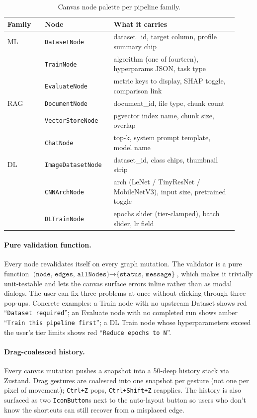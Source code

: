 \documentclass[12pt, a4paper, oneside]{report}
\begin{document}
\begin{table}[H]
\centering
\caption{Canvas node palette per pipeline family.}
\label{tab:canvas_nodes}
\begin{tabular}{|p{0.15\linewidth}|p{0.27\linewidth}|L{0.5\linewidth}|}
\hline
\textbf{Family} & \textbf{Node} & \textbf{What it carries} \\
\hline
ML  & \texttt{DatasetNode}   & dataset\_id, target column, profile summary chip \\ \hline
    & \texttt{TrainNode}     & algorithm (one of fourteen), hyperparams JSON, task type \\ \hline
    & \texttt{EvaluateNode}  & metric keys to display, SHAP toggle, comparison link \\
\hline
RAG & \texttt{DocumentNode}     & document\_id, file type, chunk count \\ \hline
    & \texttt{VectorStoreNode}  & pgvector index name, chunk size, overlap \\ \hline
    & \texttt{ChatNode}         & top-k, system prompt template, model name \\
\hline
DL  & \texttt{ImageDatasetNode} & dataset\_id, class chips, thumbnail strip \\ \hline
    & \texttt{CNNArchNode}      & arch (LeNet / TinyResNet / MobileNetV3), input size, pretrained toggle \\ \hline
    & \texttt{DLTrainNode}      & epochs slider (tier-clamped), batch slider, lr field \\
\hline
\end{tabular}
\end{table}

\paragraph{Pure validation function.} Every node revalidates itself
on every graph mutation. The validator is a pure function
$\texttt{(node, edges, allNodes)} \to \texttt{\{status, message\}}$,
which makes it trivially unit-testable and lets the canvas surface
errors inline rather than as modal dialogs. The user can fix three
problems at once without clicking through three pop-ups. Concrete
examples: a Train node with no upstream Dataset shows red
``\texttt{Dataset required}''; an Evaluate node with no completed
run shows amber ``\texttt{Train this pipeline first}''; a DL Train
node whose hyperparameters exceed the user's tier limits shows red
``\texttt{Reduce epochs to N}''.

\paragraph{Drag-coalesced history.} Every canvas mutation pushes a
snapshot into a 50-deep history stack via Zustand. Drag gestures
are coalesced into one snapshot per gesture (not one per pixel of
movement); \texttt{Ctrl+Z} pops, \texttt{Ctrl+Shift+Z} reapplies.
The history is also surfaced as two \texttt{IconButton}s next to
the auto-layout button so users who don't know the shortcuts can
still recover from a misplaced edge.
\end{document}
